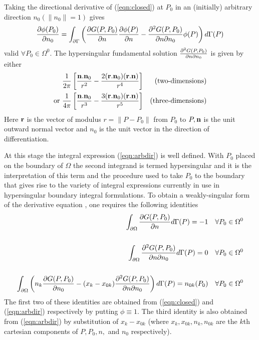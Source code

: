 Taking the directional derivative of (\ref{eqn:closed}) at $P_{0}$ in an
(initially) arbitrary direction $n_{0} (\parallel n_{0}\parallel =1)$ gives
\begin{equation}       
   \dfrac{\partial \phi(P_{0})}{\partial n_{0}}  = \int_{\partial\Gamma}\left( \dfrac{\partial G(P,P_{0})}{\partial n} 
     \dfrac{\partial \phi(P)}{\partial n} -\frac{\partial^{2}G(P,P_{0})}{\partial n\partial n_{0}}
    \phi(P)\right)d\Gamma(P)
 \label{eqn:arbdir}
\end{equation} 
valid $\forall P_{0}\in \Omega^{0}$.  The hypersingular fundamental solution
$\frac{\partial^{2}G(P,P_{0})}{\partial n\partial n_{0}}$ is given by either
\begin{eqnarray*}
  &\frac{1}{2\pi}\left[\frac{{\bf n.n}_{0}}{r^{2}}-\frac{2({\bf r.n}_{0})
      ({\bf r.n})}{r^{4}}\right] & \mbox{(two-dimensions)}\\ \mbox{or
    }&\frac{1}{4\pi}\left[\frac{{\bf n.n}_{0}}{r^{3}} -\frac{3({\bf r.n}_{0})
      ({\bf r.n})}{r^{5}}\right] & \mbox{(three-dimensions)}
\end{eqnarray*}
Here ${\bf r}$ is the vector of modulus $r = \parallel P-P_{0}\parallel$ from
$P_{0}$ to $P, {\bf n}$ is the unit outward normal vector and $n_{0}$ is the
unit vector in the direction of differentiation.

At this stage the integral expression (\ref{eqn:arbdir}) is well defined.  With
$P_{0}$ placed on the boundary of $\Omega$ the second integrand is termed
hypersingular and it is the interpretation of this term and the procedure used
to take $P_{0}$ to the boundary that gives rise to the variety of integral
expressions currently in use in hypersingular boundary integral formulations.
To obtain a weakly-singular form of the derivative equation , one requires the
following identities
\begin{eqnarray}
 \int_{\partial\Omega} \dfrac{\partial G(P,P_{0})}{\partial n} d\Gamma(P)=-1 & & 
  \forall P_{0}\in \Omega^{0}\\
 \nonumber\\
 \int_{\partial\Omega}\frac{\partial^{2}G(P,P_{0})}{\partial n\partial n_{0}}d\Gamma(P)=0  & & \forall P_{0}\in \Omega^{0}\\
 \nonumber\\
 \int_{\partial\Omega}\left(n_{k} \dfrac{\partial G(P,P_{0})}{\partial n_{0}} -(x_{k}-x_{0k})
  \frac{\partial^{2}G(P,P_{0})}{\partial n\partial n_{0}}\right)d\Gamma(P)=
  n_{0k}(P_{0}) & & 
  \forall P_{0}\in \Omega^{0}
\end{eqnarray}
The first two of these identities are obtained from (\ref{eqn:closed}) and
(\ref{eqn:arbdir}) respectively by putting $\phi \equiv 1$.  The third identity
is also obtained from (\ref{eqn:arbdir}) by substitution of $x_{k}-x_{0k}$
(where $x_{k}, x_{0k}, n_{k}, n_{0k}$ are the $k$th cartesian components of
$P, P_{0}, n,$ and $n_{0}$ respectively).


